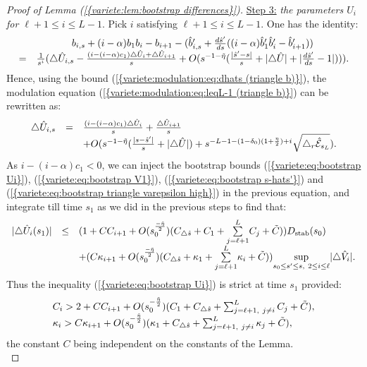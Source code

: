 \documentclass[11pt,a4paper,reqno]{amsart}
\theoremstyle{remark}
\numberwithin{equation}{section}
\begin{document}
\begin{proof}[Proof of Lemma {{\rm (\ref{{variete:lem:bootstrap differences}})}}]
\underline{Step 3:}  \emph{the parameters $U_i$ for $\ell+1\leq i \leq L-1$}. Pick $i$ satisfying $\ell+1\leq i \leq L-1$. One has the identity:
$$
\begin{array}{r c l}
&b_{i,s}+(i-\alpha)b_1b_i-b_{i+1}-(\hat{b}'_{i,s}+\frac{d\hat{s}'}{ds}((i-\alpha)\hat{b}'_1\hat{b}'_i-\hat{b}'_{i+1}))\\
=& \frac{1}{s^i}(\triangle \hat{U}_{i,s}-\frac{(i-(i-\alpha)c_1)\triangle \hat{U}_i+\triangle \hat{U}_{i+1}}{s}+O(s^{-1-\tilde{\eta}}(\frac{|\hat{s}'-s|}{s}+|\triangle \hat{U}|+|\frac{d\hat{s}'}{ds}-1|))).
\end{array}
$$
Hence, using the bound {{\rm (\ref{{variete:modulation:eq:dhats (triangle b)}})}}, the modulation equation {{\rm (\ref{{variete:modulation:eq:leqL-1 (triangle b)}})}} can be rewritten as:
$$
\begin{array}{r c l}
\triangle \hat{U}_{i,s}&=&\frac{(i-(i-\alpha)c_1)\triangle \hat{U}_i}{s}+\frac{\triangle \hat{U}_{i+1}}{s}\\
&&+O(s^{-1-\tilde{\eta}}(\frac{|s-\hat{s}'|}{s}+|\triangle \hat{U}|)+s^{-L-1-(1-\delta_0)(1+\frac{\eta}{2})+i}\sqrt{\triangle_r \hat{\mathcal{E}}_{s_L}}).
\end{array}
$$
As $i-(i-\alpha)c_1<0$, we can inject the bootstrap bounds {{\rm (\ref{{variete:eq:bootstrap Ui}})}}, {{\rm (\ref{{variete:eq:bootstrap V1}})}}, {{\rm (\ref{{variete:eq:bootstrap s-hats'}})}} and {{\rm (\ref{{variete:eq:bootstrap triangle varepsilon high}})}} in the previous equation, and integrate till time $s_1$ as we did in the previous steps to find that:
$$
\begin{array}{r c l}
|\triangle \hat{U}_{i}(s_1)| &\leq& (1+CC_{i+1}+O(s_0^{\frac{-\tilde{\eta}}{2}})(C_{\triangle \hat{s}}+C_1+\underset{j=\ell+1}{\overset{L}{\sum}} C_j+\tilde{C}))D_{\text{stab}}(s_0)\\
&&+(C\kappa_{i+1}+O(s_0^{\frac{-\tilde{\eta}}{2}})(C_{\triangle \hat{s}}+\kappa_1+\underset{j=\ell+1}{\overset{L}{\sum}} \kappa_i+\tilde{C}))\underset{s_0\leq s' \leq s, \ 2\leq i \leq \ell}{\text{sup}}|\triangle \hat{V}_i|.
\end{array}
$$
Thus the inequality {{\rm (\ref{{variete:eq:bootstrap Ui}})}} is strict at time $s_1$ provided:
\begin{equation} \label{variete:bootstrap:condition Ui}
\begin{array}{l l}
C_i>2+CC_{i+1}+O(s_0^{-\frac{\tilde{\eta}}{2}})(C_1+C_{\triangle \hat{s}}+\sum_{j=\ell+1, \ j\neq i}^L C_j+\tilde{C}), \\
\kappa_i > C\kappa_{i+1}+O(s_0^{-\frac{\tilde{\eta}}{2}})(\kappa_1+C_{\triangle \hat{s}}+\sum_{j=\ell+1, \ j \neq i}^L \kappa_j+\tilde{C}),
\end{array}
\end{equation}
the constant $C$ being independent on the constants of the Lemma.\\


\end{proof}
\end{document}
